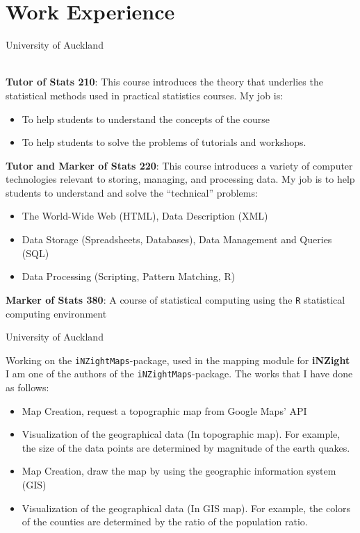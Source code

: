 \documentclass[11pt,a4paper, twoside]{moderncv} %
\begin{document}
\section{Work Experience}
  {University of Auckland}{}{}{
	~\\
	\textbf{Tutor of Stats 210}: This course introduces the theory that underlies the statistical methods used in practical statistics courses. My job is:
		\begin{itemize}
			\item To help students to understand the concepts of the course
			\item To help students to solve the problems of tutorials and workshops. \\
		\end{itemize}	
	\textbf{Tutor and Marker of Stats 220}: This course introduces a variety of computer technologies relevant to storing, managing, and processing data. My job is to help students to understand and solve the ``technical'' problems:
		\begin{itemize}
			\item The World-Wide Web (HTML), Data Description (XML)
			\item Data Storage (Spreadsheets, Databases), Data Management and Queries (SQL)
			\item Data Processing (Scripting, Pattern Matching, R) \\
		\end{itemize}
	\textbf{Marker of Stats 380}: A course of statistical computing using the \texttt{R} statistical computing environment\\}

  {University of Auckland}{}{}{
	Working on the \texttt{iNZightMaps}-package, used in the mapping module for \textbf{iNZight} I am one of the authors of the \texttt{iNZightMaps}-package. The works that I have done as follows:
	\begin{itemize}
		\item Map Creation, request a topographic map from Google Maps' API
		\item Visualization of the geographical data (In topographic map). For example, the size of the data points are determined by magnitude of the earth quakes.
		\item Map Creation, draw the map by using the geographic information system (GIS)
		\item Visualization of the geographical data (In GIS map). For example, the colors of the counties are determined by the ratio of the population ratio.
	\end{itemize}
}
\end{document}
